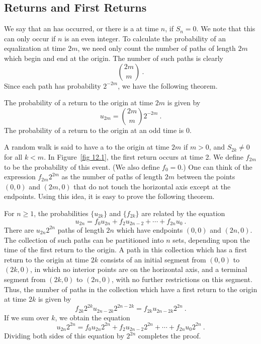 \subsection*{Returns and First Returns}
We say that an  has occurred, or there is a  at time $n$, if $S_n = 0$.  We note that this can only
occur if $n$ is an even integer.  To  calculate the probability of an equalization at time $2m$,
we  need only count the number of paths of length
$2m$ which begin and end at the origin.  The number of such paths is clearly
$${2m \choose m}\ .$$
Since each path has probability $2^{-2m}$, we have the following theorem.
\begin{theorem}\label{thm 12.1.1} 
The probability of a return to
the origin at time $2m$ is given by 
$$u_{2m} = {2m \choose m}2^{-2m}\ .$$
The probability of a return to the origin at an odd time is 0.
\end{theorem}%
A random walk is said to have a  to the origin  at time
$2m$ if
$m > 0$, and
$S_{2k} \ne 0$ for all $k < m$.  In Figure~\ref{fig 12.1}, the first return occurs at time 2. 
We define $f_{2m}$ to be the probability of this event.  (We also define $f_0 = 0$.)  One can think of
the expression
$f_{2m}2^{2m}$ as the number of paths of length
$2m$ between the points $(0, 0)$ and $(2m, 0)$ that do not touch the horizontal axis except at
the endpoints.  Using this idea, it is easy to prove the following theorem.
\begin{theorem}\label{thm 12.1.2} 
For $n \ge 1$, the probabilities $\{u_{2k}\}$ and $\{f_{2k}\}$ are related by the equation
$$u_{2n} = f_0 u_{2n} + f_2 u_{2n-2} + \cdots + f_{2n}u_0\ .$$
\proof
There are $u_{2n}2^{2n}$ paths of length $2n$ which have endpoints $(0, 0)$ and $(2n, 0)$.  The
collection of such paths can be partitioned into $n$ sets, depending upon the time of the
first return to the origin.  A path in this collection which has a first return to the origin
at time $2k$ consists of an initial segment from $(0, 0)$ to $(2k, 0)$, in which no interior
points are on the horizontal axis, and a terminal segment from $(2k, 0)$ to $(2n, 0)$, with no
further restrictions on this segment.  Thus, the number of paths in the collection which have a
first return to the origin at time $2k$ is given by
$$f_{2k}2^{2k}u_{2n-2k}2^{2n-2k} = f_{2k}u_{2n-2k}2^{2n}\ .$$
If we sum over $k$, we obtain the equation
$$u_{2n}2^{2n} = f_0u_{2n} 2^{2n} + f_2u_{2n-2}2^{2n} + \cdots + f_{2n}u_0 2^{2n}\ .$$
Dividing both sides of this equation by $2^{2n}$ completes the proof.
\end{theorem}
